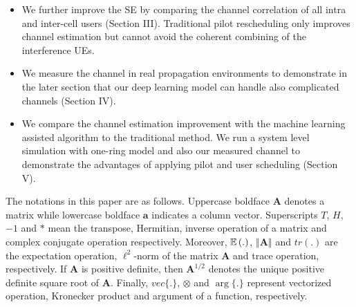 \begin{itemize}
\item We further improve the SE by comparing the channel correlation of all intra and inter-cell users (Section III). Traditional pilot rescheduling only improves channel estimation but cannot avoid the coherent combining of the interference UEs.
\item We measure the channel in real propagation environments to demonstrate in the later section that our deep learning model can handle also complicated channels (Section IV). 
\item We compare the channel estimation improvement with the machine learning assisted algorithm to the traditional method. We run a system level simulation with one-ring model and also our measured channel to demonstrate the advantages of applying pilot and user scheduling (Section V).
\end{itemize}
The notations in this paper are as follows. Uppercase boldface $\mathbf{A}$ denotes a matrix while lowercase
boldface $\mathbf{a}$ indicates a column vector.
Superscripts $T$, $H$, $-1$ and $*$ mean the transpose, Hermitian, inverse operation of a matrix and complex conjugate operation respectively. Moreover, $\operatorname{\mathbb{E}}{(.)}$, $\left\Vert\mathbf{A}\right\Vert$ and $tr(.)$ are the expectation operation, $\ell^2$-norm of the matrix $\mathbf{A}$ and trace operation, respectively. If $\mathbf{A}$ is positive definite, then $\mathbf{A}^{1/2}$ denotes the unique positive definite square root of $\mathbf{A}$. Finally, $vec\{.\}$, $\otimes$ and $\arg\{.\}$ represent vectorized operation, Kronecker product and argument of a function, respectively.  


